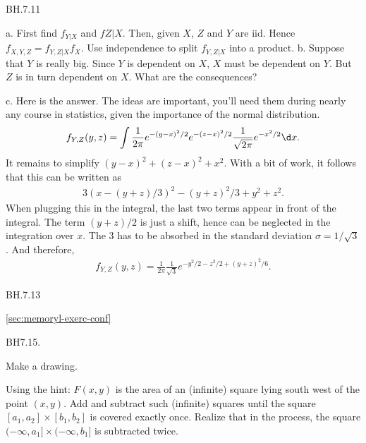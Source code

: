 \begin{exercise}
BH.7.11
\begin{hint}
a.
First find $f_{Y|X}$ and $f{Z|X}$. Then, given $X$, $Z$ and $Y$ are iid. Hence $f_{X,Y,Z} = f_{Y, Z |X} f_{X}$. Use independence to split $f_{Y,Z|X}$ into a product.
b.
Suppose that $Y$ is really big. Since $Y$ is dependent on $X$, $X$ must be dependent on $Y$. But $Z$ is in turn dependent on $X$. What are the consequences?

\end{hint}
\begin{solution}
 c.
Here is the answer. The ideas are important, you'll need them during nearly any course in statistics, given the importance of the normal distribution.
\begin{align*}
f_{Y,Z}(y, z) = \int \frac 1 {2\pi} e^{-(y-x)^2/2} e^{-(z-x)^2/2} \frac 1 {\sqrt{2\pi}} e^{-x^2/2}\d x.
\end{align*}
It remains to simplify $(y-x)^2 + (z-x)^2 + x^2$. With a bit of work, it follows that this can be written as
\begin{align*}
3(x-(y+z)/3)^{2} - (y+z)^2/3+y^2+z^2.
\end{align*}
When plugging this in the integral, the last two terms appear in front of the integral. The term $(y+z)/2$ is just a shift, hence can be neglected in the integration over $x$. The $3$ has to be absorbed in the standard deviation $\sigma=1/\sqrt{3}$. And therefore,
\begin{align*}
f_{Y,Z}(y, z) = \frac 1 {2\pi} \frac 1 {\sqrt{3}} e^{-y^2/2 - z^2/2 + (y+z)^2/6}.
\end{align*}
\end{solution}
\end{exercise}

\begin{exercise}
BH.7.13
\begin{hint}
\cref{sec:memoryl-exerc-conf}
\end{hint}
\begin{solution}
\end{solution}
\end{exercise}

\begin{exercise}
BH7.15.
\begin{hint}
Make a drawing.
\end{hint}
\begin{solution}
Using the hint: $F(x,y)$ is the area of an (infinite) square lying  south west of the point $(x,y)$. Add and subtract such (infinite) squares until the square $[a_1,a_2] \times [b_{1},b_2]$ is covered exactly once. Realize that in the process, the square $(-\infty, a_1] \times (-\infty, b_1]$ is subtracted twice.
\end{solution}
\end{exercise}


